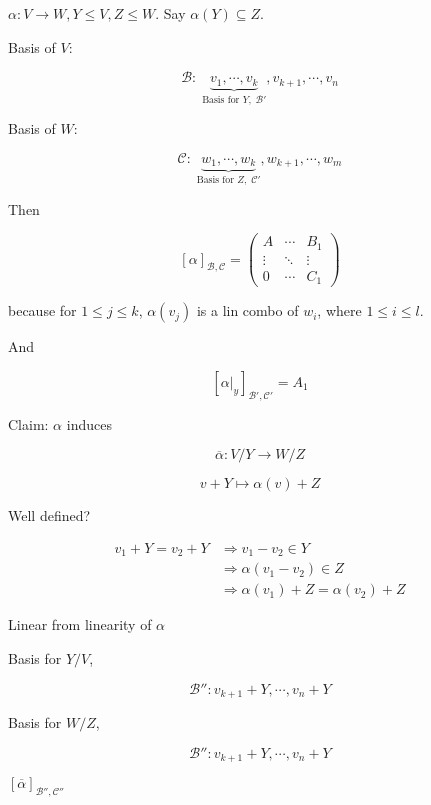 \documentclass[a4paper]{article}
\begin{document}
\begin{eg}
	$ \alpha : V \to W, Y \leq V, Z \leq W$. Say $ \alpha(Y) \subseteq Z $.
	
	Basis of $ V: $
	
	\[ \mathcal{B}: \; \underbrace{v_{1},\cdots,v_{k}}_{\text{Basis for } Y, \; \mathcal{B}'},v_{k+1},\cdots,v_{n}  \]
	
	
	Basis of $ W: $
	
	\[ \mathcal{C}: \; \underbrace{w_{1},\cdots,w_{k}}_{\text{Basis for } Z, \; \mathcal{C}'},w_{k+1},\cdots,w_{m}  \]
	
	Then 
	
	\[ [\alpha]_{\mathcal{B},\mathcal{C}}  = \begin{pmatrix}
	A & \cdots & B_{1} \\
	\vdots & \ddots & \vdots \\
	0 & \cdots & C_{1}  
	\end{pmatrix}\]
	
	because for $ 1 \leq j \leq k $, $ \alpha(v_{j}) $ is a lin combo of $ w_{i} $, where $ 1 \leq i \leq l $. 
	
	And
	
	\[ [\alpha |_{y}]_{\mathcal{B}',\mathcal{C}'} = A_{1} \]
	
	Claim: $ \alpha $ induces 
	
	\[ \overline{\alpha} : V / Y \to W / Z \]
	
	\[ v + Y \mapsto  \alpha(v) + Z  \]
	
	Well defined? 
	
	\begin{align*}
	v_{1} + Y = v_{2} + Y & \Rightarrow v_{1} - v_{2} \in Y \\
	& \Rightarrow \alpha(v_{1} - v_{2}) \in Z \\
	& \Rightarrow \alpha(v_{1})  + Z = \alpha(v_{2}) + Z
	\end{align*}
	
\begin{ex}
		Linear from linearity of $  \alpha $
\end{ex}

Basis for $ Y / V $,

\[ \mathcal{B}'' : v_{k+1} + Y, \cdots, v_{n} + Y \]

Basis for $ W / Z $, 

\[ \mathcal{B}'' : v_{k+1} + Y, \cdots, v_{n} + Y \] 

\begin{ex}
	$ [\overline{\alpha}]_{\mathcal{B}'',\mathcal{C}''} $
\end{ex}

\end{eg}
\end{document}
